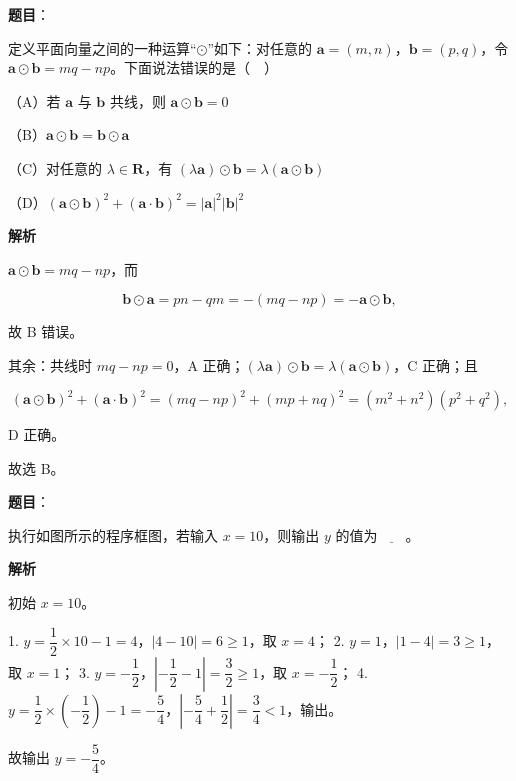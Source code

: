 \begin{answer}

\textbf{题目}：

定义平面向量之间的一种运算“$\odot$”如下：对任意的 $\boldsymbol a=(m,n)$，$\boldsymbol b=(p,q)$，令 $\boldsymbol a\odot\boldsymbol b=mq-np$。下面说法错误的是（　）

（A）若 $\boldsymbol a$ 与 $\boldsymbol b$ 共线，则 $\boldsymbol a\odot\boldsymbol b=0$

（B）$\boldsymbol a\odot\boldsymbol b=\boldsymbol b\odot\boldsymbol a$

（C）对任意的 $\lambda\in\mathbf R$，有 $(\lambda\boldsymbol a)\odot\boldsymbol b=\lambda(\boldsymbol a\odot\boldsymbol b)$

（D）$(\boldsymbol a\odot\boldsymbol b)^2+(\boldsymbol a\cdot\boldsymbol b)^2=|\boldsymbol a|^2|\boldsymbol b|^2$

\textbf{解析}

$\boldsymbol a\odot\boldsymbol b=mq-np$，而

\nopagebreak[4]
\[\boldsymbol b\odot\boldsymbol a=pn-qm=-(mq-np)=-\boldsymbol a\odot\boldsymbol b,\]

故 B 错误。

其余：共线时 $mq-np=0$，A 正确；$(\lambda\boldsymbol a)\odot\boldsymbol b=\lambda(\boldsymbol a\odot\boldsymbol b)$，C 正确；且

\nopagebreak[4]
\[(\boldsymbol a\odot\boldsymbol b)^2+(\boldsymbol a\cdot\boldsymbol b)^2
=(mq-np)^2+(mp+nq)^2
=(m^2+n^2)(p^2+q^2),\]

D 正确。

故选 B。


\end{answer}
\begin{answer}

\textbf{题目}：

执行如图所示的程序框图，若输入 $x=10$，则输出 $y$ 的值为$\underline{\qquad}$。
\nopagebreak[4]
\begin{center}\end{center}
\nopagebreak[4]
\textbf{解析}

初始 $x=10$。

1. $y=\dfrac12\times10-1=4$，$|4-10|=6\geqslant1$，取 $x=4$；
2. $y=1$，$|1-4|=3\geqslant1$，取 $x=1$；
3. $y=-\dfrac12$，$\left|-\dfrac12-1\right|=\dfrac32\geqslant1$，取 $x=-\dfrac12$；
4. $y=\dfrac12\times\left(-\dfrac12\right)-1=-\dfrac54$，$\left|-\dfrac54+\dfrac12\right|=\dfrac34<1$，输出。

故输出 $y=-\dfrac54$。


\end{answer}
